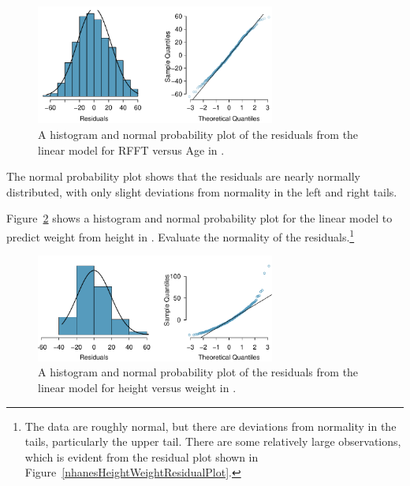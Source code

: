 \begin{figure}[h!]
	\centering
	\includegraphics[width=0.7\textwidth]
	{ch_simple_linear_regression_oi_biostat/figures/prevendResidNormPlot/prevendResidNormPlot.pdf}
	\caption{A histogram and normal probability plot of the residuals from the linear model for RFFT versus Age in .}
	\label{prevendResidNormPlot}
\end{figure}

The normal probability plot shows that the residuals are nearly normally distributed, with only slight deviations from normality in the left and right tails.

\begin{exercise}Figure~\ref{nhanesResidNormPlot} shows a histogram and normal probability plot for the linear model to predict weight from height in . Evaluate the normality of the residuals.\footnote{The data are roughly normal, but there are deviations from normality in the tails, particularly the upper tail. There are some relatively large observations, which is evident from the residual plot shown in Figure~\ref{nhanesHeightWeightResidualPlot}.}
	
\begin{figure}[h!]
	\centering
	\includegraphics[width=0.7\textwidth]
	{ch_simple_linear_regression_oi_biostat/figures/nhanesHeightWeightResiduals/nhanesHeightWeightResiduals.pdf}
	\caption{A histogram and normal probability plot of the residuals from the linear model for height versus weight in . }
	\label{nhanesResidNormPlot}
\end{figure}	
	
\end{exercise}

